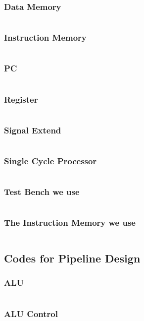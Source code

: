 \documentclass{article}[12pt]
\begin{document}
		\subsubsection{Data Memory}
			\inputminted{verilog}{singlecycle/dataMemory.v}
		\subsubsection{Instruction Memory}
			\inputminted{verilog}{singlecycle/instructionMemory.v}
		\subsubsection{PC}
			\inputminted{verilog}{singlecycle/PC.v}
		\subsubsection{Register}
			\inputminted{verilog}{singlecycle/register.v}
		\subsubsection{Signal Extend}
			\inputminted{verilog}{singlecycle/signExtend.v}
		\subsubsection{Single Cycle Processor}
			\inputminted{verilog}{singlecycle/singleCycle.v}
		\subsubsection{Test Bench we use}
			\inputminted{verilog}{singlecycle/test_bench.v}
		\subsubsection{The Instruction Memory we use}
			\inputminted{ca65}{singlecycle/InstructionMem_for_P2_Demo_updated.txt}
	
	\newpage
	\subsection{Codes for Pipeline Design}
		\subsubsection{ALU}
			\inputminted{verilog}{pipeline/ALU.v}
		\subsubsection{ALU Control}
			\inputminted{verilog}{pipeline/ALUControl.v}
\end{document}
